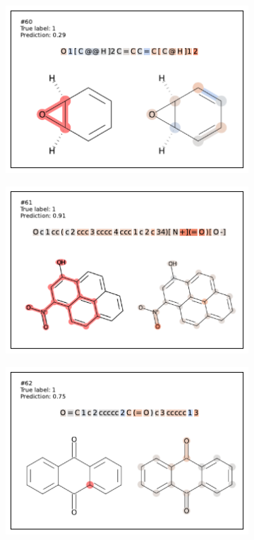 \begin{figure}
\begin{subfigure}[b]{0.33\textwidth}
\end{subfigure} 
\begin{subfigure}[b]{0.33\textwidth} 
  \centering 
  \includegraphics[width=\textwidth]{figures/ames/ames60.pdf} 
\end{subfigure}\begin{subfigure}[b]{0.33\textwidth} 
  \centering 
  \includegraphics[width=\textwidth]{figures/ames/ames61.pdf} 
\end{subfigure}\begin{subfigure}[b]{0.33\textwidth} 
  \centering 
  \includegraphics[width=\textwidth]{figures/ames/ames62.pdf} 

\end{subfigure}
\end{figure}
